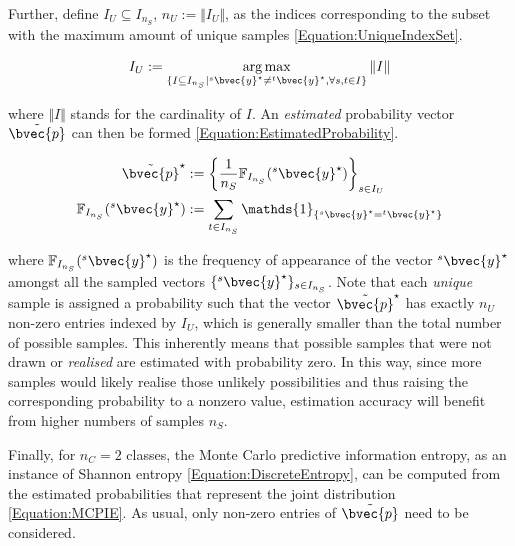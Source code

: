 			Further, define $I_{U} \subseteq I_{n_{S}}$, $n_{U} := \Vert I_{U} \Vert$, as the indices corresponding to the subset with the maximum amount of unique samples \eqref{Equation:UniqueIndexSet}.
			
			\begin{equation}
				I_{U} := \argmax_{\{I \subseteq I_{n_{S}} | {^{s}}\bvec{y}^{\star} \neq {^{t}}\bvec{y}^{\star}, \forall s, t \in I\}} \Vert I \Vert 
			\label{Equation:UniqueIndexSet}
			\end{equation}			
			
			where $\Vert I \Vert$  stands for the cardinality of $I$. An \textit{estimated} probability vector $\tilde{\bvec{p}}$ can then be formed \eqref{Equation:EstimatedProbability}.

			\begin{equation}
				\begin{aligned}
					\tilde{\bvec{p}}^{\star} &:= \bigg\{ \frac{1}{n_{S}}\mathbb{F}_{I_{n_{S}}}({^{s}}\bvec{y}^{\star}) \bigg\}_{s \in I_{U}} \\
					\mathbb{F}_{I_{n_{S}}}({^{s}}\bvec{y}^{\star}) &:= \sum_{t \in I_{n_{S}}} \mathds{1}_{\{{^{s}}\bvec{y}^{\star} = {^{t}}\bvec{y}^{\star}\}}
				\end{aligned}
			\label{Equation:EstimatedProbability}
			\end{equation}
			
			where $\mathbb{F}_{I_{n_{S}}}({^{s}}\bvec{y}^{\star})$ is the frequency of appearance of the vector ${^{s}}\bvec{y}^{\star}$ amongst all the sampled vectors $\{ {^{s}}\bvec{y}^{\star} \}_{s \in I_{n_{S}}}$. Note that each \textit{unique} sample is assigned a probability such that the vector $\tilde{\bvec{p}}^{\star}$ has exactly $n_{U}$ non-zero entries indexed by $I_{U}$, which is generally smaller than the total number of possible samples. This inherently means that possible samples that were not drawn or \textit{realised} are estimated with probability zero. In this way, since more samples would likely realise those unlikely possibilities and thus raising the corresponding probability to a nonzero value, estimation accuracy will benefit from higher numbers of samples $n_{S}$.
			
			Finally,  for $n_{C} = 2$ classes, the Monte Carlo predictive information entropy, as an instance of Shannon entropy \eqref{Equation:DiscreteEntropy}, can be computed from the estimated probabilities that represent the joint distribution \eqref{Equation:MCPIE}. As usual, only non-zero entries of $\tilde{\bvec{p}}$ need to be considered. 
			

